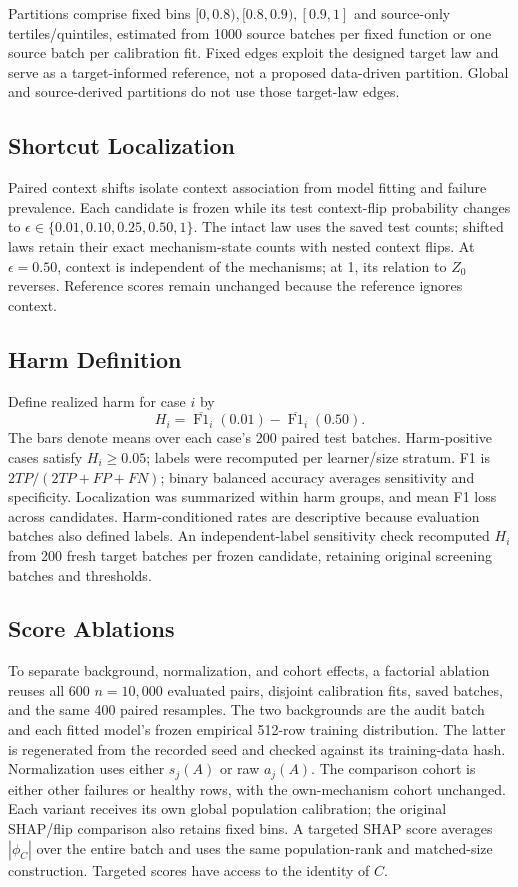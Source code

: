 \documentclass[conference]{IEEEtran}
\begin{document}
Partitions comprise fixed bins $[0,0.8),[0.8,0.9),[0.9,1]$ and source-only tertiles/quintiles, estimated from 1000 source batches per fixed function or one source batch per calibration fit. Fixed edges exploit the designed target law and serve as a target-informed reference, not a proposed data-driven partition. Global and source-derived partitions do not use those target-law edges.

\subsection{Shortcut Localization}
Paired context shifts isolate context association from model fitting and failure prevalence. Each candidate is frozen while its test context-flip probability changes to $\epsilon\in\{0.01,0.10,0.25,0.50,1\}$. The intact law uses the saved test counts; shifted laws retain their exact mechanism-state counts with nested context flips. At $\epsilon=0.50$, context is independent of the mechanisms; at 1, its relation to $Z_0$ reverses. Reference scores remain unchanged because the reference ignores context.

\subsection{Harm Definition}
Define realized harm for case $i$ by
\begin{equation}
 H_i=\overline{\operatorname{F1}}_i(0.01)-\overline{\operatorname{F1}}_i(0.50).
\end{equation}
The bars denote means over each case's 200 paired test batches. Harm-positive cases satisfy $H_i\geq0.05$; labels were recomputed per learner/size stratum. F1 is $2TP/(2TP+FP+FN)$; binary balanced accuracy averages sensitivity and specificity. Localization was summarized within harm groups, and mean F1 loss across candidates. Harm-conditioned rates are descriptive because evaluation batches also defined labels. An independent-label sensitivity check recomputed $H_i$ from 200 fresh target batches per frozen candidate, retaining original screening batches and thresholds.

\subsection{Score Ablations}
To separate background, normalization, and cohort effects, a factorial ablation reuses all 600 $n=10{,}000$ evaluated pairs, disjoint calibration fits, saved batches, and the same 400 paired resamples. The two backgrounds are the audit batch and each fitted model's frozen empirical 512-row training distribution. The latter is regenerated from the recorded seed and checked against its training-data hash. Normalization uses either $s_j(A)$ or raw $a_j(A)$. The comparison cohort is either other failures or healthy rows, with the own-mechanism cohort unchanged. Each variant receives its own global population calibration; the original SHAP/flip comparison also retains fixed bins. A targeted SHAP score averages $|\phi_C|$ over the entire batch and uses the same population-rank and matched-size construction. Targeted scores have access to the identity of $C$.
\end{document}
